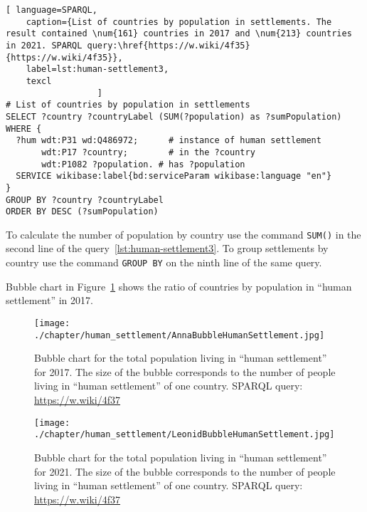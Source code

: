 \lstset{numbers=left, firstnumber=1, frame=single}
\begin{lstlisting}[ language=SPARQL, 
    caption={List of countries by population in settlements. The result contained \num{161} countries in 2017 and \num{213} countries in 2021. SPARQL query:\href{https://w.wiki/4f35}{https://w.wiki/4f35}},
    label=lst:human-settlement3,
    texcl 
                  ]
# List of countries by population in settlements
SELECT ?country ?countryLabel (SUM(?population) as ?sumPopulation)
WHERE {
  ?hum wdt:P31 wd:Q486972;  	# instance of human settlement
       wdt:P17 ?country;    	# in the ?country
       wdt:P1082 ?population. # has ?population
  SERVICE wikibase:label{bd:serviceParam wikibase:language "en"}
}
GROUP BY ?country ?countryLabel 
ORDER BY DESC (?sumPopulation)
\end{lstlisting}%

%

To calculate the number of population by country
use the command \lstinline|SUM()| in the second line of the query~\ref{lst:human-settlement3}.
To group settlements by country
use the command \lstinline|GROUP BY| on the ninth line of the same query.

Bubble chart in Figure~\ref{fig:human-settlement-1}
shows the ratio of countries by population in ``human settlement'' in 2017.

\begin{figure}
\centering
	\texttt{[image: ./chapter/human\_settlement/AnnaBubbleHumanSettlement.jpg]}
	\label{fig:human-settlement-1}
    \caption[Bubble chart for the total population in ``human settlement'', 2017.] {Bubble chart for the total population living in ``human settlement'' for 2017. The size of the bubble corresponds to the number of people living in ``human settlement'' of one country. SPARQL query: \href{https://w.wiki/4f37}{https://w.wiki/4f37}}
\end{figure}

\begin{figure}
\centering
	\texttt{[image: ./chapter/human\_settlement/LeonidBubbleHumanSettlement.jpg]}
	\label{fig:human-settlement-2}
	\caption[Bubble chart for the total population in ``human settlement'', 2021.] {Bubble chart for the total population living in ``human settlement'' for 2021. The size of the bubble corresponds to the number of people living in ``human settlement'' of one country. SPARQL query: \href{https://w.wiki/4f37}{https://w.wiki/4f37}}
\end{figure}

